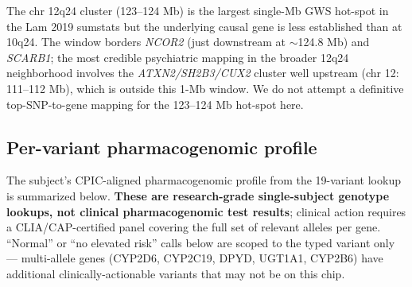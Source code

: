 \documentclass[11pt,a4paper]{article}
\begin{document}
The chr 12q24 cluster (123--124 Mb) is the largest single-Mb GWS hot-spot in the Lam 2019 sumstats but the underlying causal gene is less established than at 10q24. The window borders \emph{NCOR2} (just downstream at $\sim$124.8 Mb) and \emph{SCARB1}; the most credible psychiatric mapping in the broader 12q24 neighborhood involves the \emph{ATXN2/SH2B3/CUX2} cluster well upstream (chr 12: 111--112 Mb), which is outside this 1-Mb window. We do not attempt a definitive top-SNP-to-gene mapping for the 123--124 Mb hot-spot here.

\subsection{Per-variant pharmacogenomic profile}

The subject's CPIC-aligned pharmacogenomic profile from the 19-variant lookup is summarized below. \textbf{These are research-grade single-subject genotype lookups, not clinical pharmacogenomic test results}; clinical action requires a CLIA/CAP-certified panel covering the full set of relevant alleles per gene. ``Normal'' or ``no elevated risk'' calls below are scoped to the typed variant only --- multi-allele genes (CYP2D6, CYP2C19, DPYD, UGT1A1, CYP2B6) have additional clinically-actionable variants that may not be on this chip.
\end{document}
